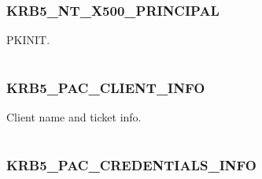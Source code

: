 \documentclass[letterpaper,10pt,english]{sphinxmanual}
\begin{document}
\subsubsection{KRB5\_NT\_X500\_PRINCIPAL}
\label{appdev/refs/macros/KRB5_NT_X500_PRINCIPAL:krb5-nt-x500-principal-data}\label{appdev/refs/macros/KRB5_NT_X500_PRINCIPAL::doc}\label{appdev/refs/macros/KRB5_NT_X500_PRINCIPAL:krb5-nt-x500-principal}

\begin{fulllineitems}
\label{appdev/refs/macros/KRB5_NT_X500_PRINCIPAL:KRB5_NT_X500_PRINCIPAL}
\end{fulllineitems}


PKINIT.

\begin{tabulary}{\linewidth}{|L|L|}
\hline

 & 
\\\hline
\end{tabulary}



\subsubsection{KRB5\_PAC\_CLIENT\_INFO}
\label{appdev/refs/macros/KRB5_PAC_CLIENT_INFO:krb5-pac-client-info}\label{appdev/refs/macros/KRB5_PAC_CLIENT_INFO::doc}\label{appdev/refs/macros/KRB5_PAC_CLIENT_INFO:krb5-pac-client-info-data}

\begin{fulllineitems}
\label{appdev/refs/macros/KRB5_PAC_CLIENT_INFO:KRB5_PAC_CLIENT_INFO}
\end{fulllineitems}


Client name and ticket info.

\begin{tabulary}{\linewidth}{|L|L|}
\hline

 & 
\\\hline
\end{tabulary}



\subsubsection{KRB5\_PAC\_CREDENTIALS\_INFO}
\label{appdev/refs/macros/KRB5_PAC_CREDENTIALS_INFO::doc}\label{appdev/refs/macros/KRB5_PAC_CREDENTIALS_INFO:krb5-pac-credentials-info}\label{appdev/refs/macros/KRB5_PAC_CREDENTIALS_INFO:krb5-pac-credentials-info-data}
\end{document}
